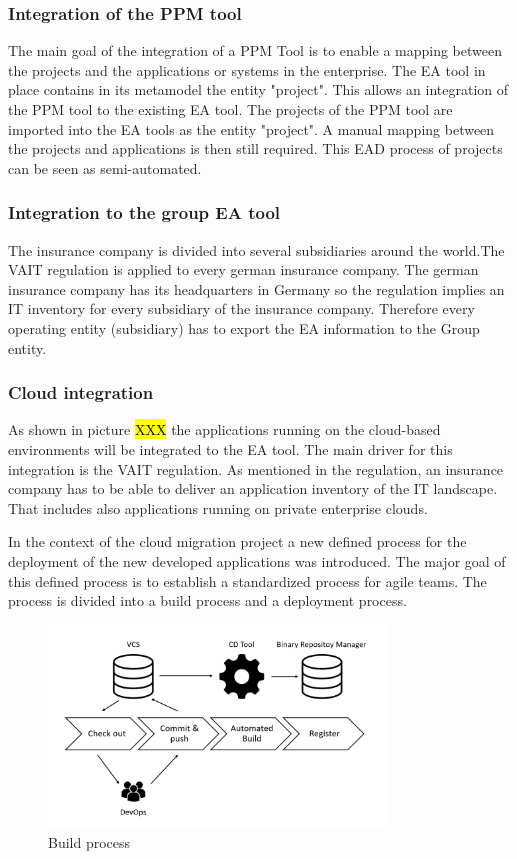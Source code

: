 \subsubsection{Integration of the PPM tool}
The main goal of the integration of a PPM Tool is to enable a mapping between the projects and the applications or systems in the enterprise. The EA tool in place contains in its metamodel the entity "project". This allows an integration of the PPM tool to the existing EA tool. The projects of the PPM tool are imported into the EA tools as the entity "project". A manual mapping between the projects and applications is then still required. This EAD process of projects can be seen as semi-automated.

\subsubsection{Integration to the group EA tool}

The insurance company is divided into several subsidiaries around the world.The VAIT regulation is applied to every german insurance company. The german insurance company has its headquarters in Germany so the regulation implies an IT inventory for every subsidiary of the insurance company. Therefore every operating entity (subsidiary) has to export the EA information to the Group entity.

\subsubsection{Cloud integration}

As shown in picture \hl{XXX} the applications running on the cloud-based environments will be integrated to the EA tool. The main driver for this integration is the VAIT regulation. As mentioned in the regulation, an insurance company has to be able to deliver an application inventory of the IT landscape. That includes also applications running on private enterprise clouds. 

In the context of the cloud migration project a new defined process for the deployment of the new developed applications was introduced. The major goal of this defined process is to establish a standardized process for agile teams. The process is divided into a build process and a deployment process.

\begin{figure}[htpb]
  \centering
  \includegraphics[width=0.8\textwidth]{figures/build-process.PNG}
  \caption{ Build process~\parencite{Corpancho Villasana 2018}}
  \label{fig:Build-process}
\end{figure}

